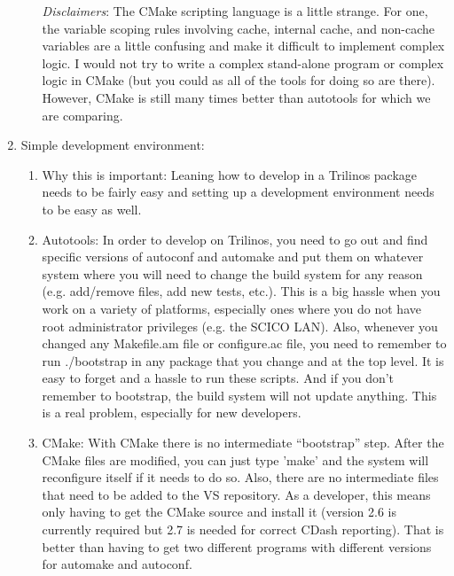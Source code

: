 \documentclass[pdf,ps2pdf,11pt]{SANDreport}
\begin{document}
\begin{enumerate}
\begin{enumerate}
  {}\textit{Disclaimers}: The CMake scripting language is a little
  strange.  For one, the variable scoping rules involving cache,
  internal cache, and non-cache variables are a little confusing and
  make it difficult to implement complex logic.  I would not try to
  write a complex stand-alone program or complex logic in CMake (but
  you could as all of the tools for doing so are there).  However,
  CMake is still many times better than autotools for which we are
  comparing.

  \end{enumerate}

{}\item Simple development environment:

  \begin{enumerate}

  {}\item Why this is important: Leaning how to develop in a Trilinos
  package needs to be fairly easy and setting up a development
  environment needs to be easy as well.

  {}\item Autotools: In order to develop on Trilinos, you need to go
  out and find specific versions of autoconf and automake and put them
  on whatever system where you will need to change the build system
  for any reason (e.g. add/remove files, add new tests, etc.).  This
  is a big hassle when you work on a variety of platforms, especially
  ones where you do not have root administrator privileges (e.g. the
  SCICO LAN).  Also, whenever you changed any Makefile.am file or
  configure.ac file, you need to remember to run ./bootstrap in any
  package that you change and at the top level.  It is easy to forget
  and a hassle to run these scripts.  And if you don't remember to
  bootstrap, the build system will not update anything.  This is a
  real problem, especially for new developers.

  {}\item CMake: With CMake there is no intermediate ``bootstrap''
  step.  After the CMake files are modified, you can just type 'make'
  and the system will reconfigure itself if it needs to do so. Also, there
  are no intermediate files that need to be added to the VS
  repository.  As a developer, this means only having to get the CMake
  source and install it (version 2.6 is currently required but 2.7 is
  needed for correct CDash reporting).  That is better than having to
  get two different programs with different versions for automake and
  autoconf. 


\end{enumerate}
\end{enumerate}
\end{document}
